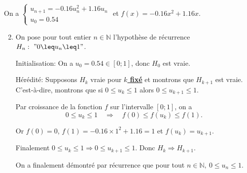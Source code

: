 \documentclass[15pt, mathserif]{beamer}
\begin{document}
\begin{frame}On a $\begin{cases} u_{n+1} = -0.16u_n^2+1.16u_n\\[1em] u_0 = 0.54\end{cases}$ et $f(x) = -0.16x^2+1.16x$.

\begin{enumerate}\setcounter{enumi}{1}

	\item On pose pour tout entier $n \in \mathbb{N}$ l'hypothèse de récurrence $H_n:~"0 \leq u_n \leq 1"$.

\medskip

Initialisation: On a $u_0 =0.54 \in [0;1]$, donc $H_0$ est vraie.

\medskip

Hérédité: Supposons $H_k$ vraie pour \textbf\underline{{$k$ fixé}} et montrons que $H_{k+1}$ est vraie. C'est-à-dire, montrons que si $0 \leq u_k \leq 1$ alors $0 \leq u_{k+1} \leq 1$.

 Par croissance de la fonction $f$ sur l'intervalle $[0;1]$, on a \[0\leq u_k \leq 1 \quad \Rightarrow \quad f(0) \leq f(u_k) \leq f(1).\]

 Or $f(0) = 0$, $f(1) = -0.16\times 1^2+1.16= 1$ et $f(u_k) = u_{k+1}$.

 Finalement $0\leq u_k \leq 1 \Rightarrow 0 \leq u_{k+1} \leq 1$. Donc $H_{k} \Rightarrow H_{k+1}$.

 On a finalement démontré par récurrence que pour tout $n \in\mathbb{N},~ 0 \leq u_n \leq 1$.

\end{enumerate}
\end{frame}
\end{document}
